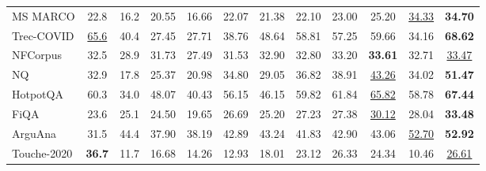 \begin{table*}[ht]
{\begin{tabular}{l|c|cc|cccccc|cc}
    MS MARCO           & 22.8          & 16.2         & 20.55\rlap{$\text{}^{\diamond}$}         & 16.66  & 22.07          & 21.38         & 22.10         & 23.00\rlap{$\text{}^{\dagger \diamond}$}        & 25.20\rlap{$\text{}^{\dagger \diamond \mathsection}$}          & \uline{34.33}  & \textbf{34.70} \\
    Trec-COVID         & \uline{65.6}  & 40.4         & 27.45         & 27.71  & 38.76          & 48.64         & 58.81         & 57.25\rlap{$\text{}^{\dagger \diamond}$}        & 59.66\rlap{$\text{}^{\dagger \diamond}$}          & 34.16  & \textbf{68.62}\rlap{$\text{}^{\mathparagraph}$}  \\
    NFCorpus           & 32.5          & 28.9         & 31.73\rlap{$\text{}^{\diamond}$}         & 27.49  & 31.53          & 32.90         & 32.80         & 33.20\rlap{$\text{}^{\dagger \diamond}$}        & \textbf{33.61}\rlap{$\text{}^{\dagger \diamond}$} & 32.71   & \uline{33.47} \\
    NQ                 & 32.9          & 17.8         & 25.37\rlap{$\text{}^{\diamond}$}         & 20.98  & 34.80          & 29.05         & 36.82         & 38.91\rlap{$\text{}^{\dagger \diamond}$}        & \uline{43.26}\rlap{$\text{}^{\dagger \diamond \mathsection}$}  & 34.02  & \textbf{51.47}\rlap{$\text{}^{\mathparagraph}$} \\
    HotpotQA           & 60.3          & 34.0         & 48.07\rlap{$\text{}^{\diamond}$}         & 40.43  & 56.15          & 46.15         & 59.82         & 61.84\rlap{$\text{}^{\dagger \diamond}$}        & \uline{65.82}\rlap{$\text{}^{\dagger \diamond \mathsection }$}  & 58.78   & \textbf{67.44}\rlap{$\text{}^{\mathparagraph}$} \\
    FiQA               & 23.6          & 25.1         & 24.50\rlap{$\text{}^{\diamond}$}         & 19.65  & 26.69          & 25.20         & 27.23         & 27.38\rlap{$\text{}^{\dagger \diamond}$}        & \uline{30.12}\rlap{$\text{}^{\dagger \diamond \mathsection}$}  & 28.04  & \textbf{33.48}\rlap{$\text{}^{\mathparagraph}$} \\
    ArguAna            & 31.5          & 44.4         & 37.90         & 38.19  & 42.89          & 43.24         & 41.83         & 42.90\rlap{$\text{}^{\dagger \diamond}$}        & 43.06\rlap{$\text{}^{\dagger \diamond}$}          & \uline{52.70} & \textbf{52.92} \\
    Touche-2020        & \textbf{36.7} & 11.7         & 16.68\rlap{$\text{}^{\diamond}$}         & 14.26  & 12.93          & 18.01         & 23.12         & 26.33\rlap{$\text{}^{\dagger \diamond}$}        & 24.34\rlap{$\text{}^{\dagger \diamond}$}          & 10.46  & \uline{26.61}\rlap{$\text{}^{\mathparagraph}$}  \\

\end{tabular}}
\end{table*}
